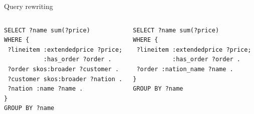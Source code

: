 \begin{frame}[fragile]{Query rewriting}
\begin{columns}
\begin{lstlisting}[style=rdf, captionpos=b,label=lst:snow, basicstyle=\scriptsize]
SELECT ?name sum(?price)
WHERE {
 ?lineitem :extendedprice ?price;
           :has_order ?order .
 ?order skos:broader ?customer .
 ?customer skos:broader ?nation .
 ?nation :name ?name .
}
GROUP BY ?name
\end{lstlisting}
\begin{lstlisting}[style=rdf, captionpos=b, label=lst:star, basicstyle=\scriptsize]
SELECT ?name sum(?price)
WHERE {
 ?lineitem :extendedprice ?price;
           :has_order ?order .
 ?order :nation_name ?name .
}
GROUP BY ?name
\end{lstlisting}
\end{columns}


\end{frame}

